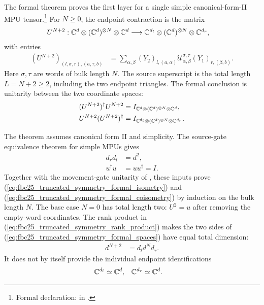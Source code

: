 \documentclass{article}
\begin{document}
The formal theorem proves the first layer for a single simple canonical-form-II
MPU tensor.\footnote{Formal declaration:
    in .}
For \(N\geq0\), the endpoint contraction is the matrix
\begin{align}
    U^{N+2} :
    \mathbb{C}^d\otimes(\mathbb{C}^d)^{\otimes N}\otimes\mathbb{C}^d
     & \longrightarrow
    \mathbb{C}^{d_l}\otimes(\mathbb{C}^d)^{\otimes N}\otimes\mathbb{C}^{d_r},
    \label{eq:fbc25_truncated_symmetry_formal_spaces}
\end{align}
with entries
\begin{align}
    (U^{N+2})_{(l,\sigma,r),(a,\tau,b)}
     & =
    \sum_{\alpha,\beta}
    (Y_2)_{l,(a,\alpha)}
    \mathcal U^{\sigma,\tau}_{\alpha,\beta}
    (Y_1)_{r,(\beta,b)}.
    \label{eq:fbc25_truncated_symmetry_formal_entries}
\end{align}
Here \(\sigma,\tau\) are words of bulk length \(N\). The source superscript
is the total length \(L=N+2\geq2\), including the two endpoint triangles. The
formal conclusion is unitarity between the two coordinate spaces:
\begin{align}
    (U^{N+2})^\dagger U^{N+2}
     & = I_{\mathbb{C}^d\otimes(\mathbb{C}^d)^{\otimes N}\otimes\mathbb{C}^d},
    \label{eq:fbc25_truncated_symmetry_formal_isometry}        \\
    U^{N+2}(U^{N+2})^\dagger
     & = I_{\mathbb{C}^{d_l}\otimes(\mathbb{C}^d)^{\otimes N}\otimes\mathbb{C}^{d_r}}.
    \label{eq:fbc25_truncated_symmetry_formal_coisometry}
\end{align}

The theorem assumes canonical form II and simplicity. The source-gate
equivalence theorem for simple MPUs gives
\cite[lines~532--543 and 563--601]{Cirac2017MPU}
\begin{align}
    d_rd_l      & = d^2,
    \label{eq:fbc25_truncated_symmetry_rank_product} \\
    u^\dagger u & = uu^\dagger = I.
    \label{eq:fbc25_truncated_symmetry_source_gate_unitarity}
\end{align}
Together with the movement-gate unitarity of
 \cite[lines~811--869 and 918--1012]{FrancoRubio2025MPUGauging},
these inputs prove
(\ref{eq:fbc25_truncated_symmetry_formal_isometry}) and
(\ref{eq:fbc25_truncated_symmetry_formal_coisometry}) by induction on the
bulk length \(N\). The base case \(N=0\) has total length two:
\(U^2=u\) after removing the empty-word coordinates.
The rank product in
(\ref{eq:fbc25_truncated_symmetry_rank_product}) makes the two sides of
(\ref{eq:fbc25_truncated_symmetry_formal_spaces}) have equal total dimension:
\begin{align}
    d^{N+2} & = d_l d^N d_r.
    \label{eq:fbc25_truncated_symmetry_total_dimension}
\end{align}
It does not by itself provide the individual endpoint identifications
\begin{align}
    \mathbb{C}^{d_l} & \simeq \mathbb{C}^d, & \mathbb{C}^{d_r} & \simeq \mathbb{C}^d.
    \label{eq:fbc25_truncated_symmetry_missing_endpoint_equivalences}
\end{align}
\end{document}
